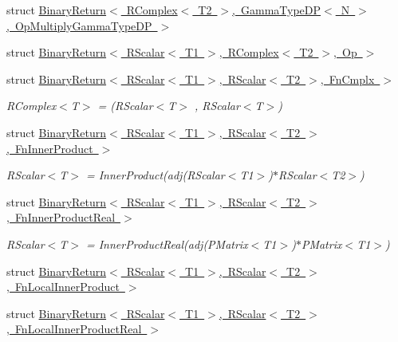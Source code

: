 \begin{DoxyCompactItemize}
\item 
struct \mbox{\hyperlink{structENSEM_1_1BinaryReturn_3_01RComplex_3_01T2_01_4_00_01GammaTypeDP_3_01N_01_4_00_01OpMultiplyGammaTypeDP_01_4}{Binary\+Return$<$ R\+Complex$<$ T2 $>$, Gamma\+Type\+D\+P$<$ N $>$, Op\+Multiply\+Gamma\+Type\+D\+P $>$}}
\item 
struct \mbox{\hyperlink{structENSEM_1_1BinaryReturn_3_01RScalar_3_01T1_01_4_00_01RComplex_3_01T2_01_4_00_01Op_01_4}{Binary\+Return$<$ R\+Scalar$<$ T1 $>$, R\+Complex$<$ T2 $>$, Op $>$}}
\item 
struct \mbox{\hyperlink{structENSEM_1_1BinaryReturn_3_01RScalar_3_01T1_01_4_00_01RScalar_3_01T2_01_4_00_01FnCmplx_01_4}{Binary\+Return$<$ R\+Scalar$<$ T1 $>$, R\+Scalar$<$ T2 $>$, Fn\+Cmplx $>$}}
\begin{DoxyCompactList}\small\item\em R\+Complex$<$\+T$>$ = (R\+Scalar$<$\+T$>$ , R\+Scalar$<$\+T$>$) \end{DoxyCompactList}\item 
struct \mbox{\hyperlink{structENSEM_1_1BinaryReturn_3_01RScalar_3_01T1_01_4_00_01RScalar_3_01T2_01_4_00_01FnInnerProduct_01_4}{Binary\+Return$<$ R\+Scalar$<$ T1 $>$, R\+Scalar$<$ T2 $>$, Fn\+Inner\+Product $>$}}
\begin{DoxyCompactList}\small\item\em R\+Scalar$<$\+T$>$ = Inner\+Product(adj(\+R\+Scalar$<$\+T1$>$)$\ast$\+R\+Scalar$<$\+T2$>$) \end{DoxyCompactList}\item 
struct \mbox{\hyperlink{structENSEM_1_1BinaryReturn_3_01RScalar_3_01T1_01_4_00_01RScalar_3_01T2_01_4_00_01FnInnerProductReal_01_4}{Binary\+Return$<$ R\+Scalar$<$ T1 $>$, R\+Scalar$<$ T2 $>$, Fn\+Inner\+Product\+Real $>$}}
\begin{DoxyCompactList}\small\item\em R\+Scalar$<$\+T$>$ = Inner\+Product\+Real(adj(\+P\+Matrix$<$\+T1$>$)$\ast$\+P\+Matrix$<$\+T1$>$) \end{DoxyCompactList}\item 
struct \mbox{\hyperlink{structENSEM_1_1BinaryReturn_3_01RScalar_3_01T1_01_4_00_01RScalar_3_01T2_01_4_00_01FnLocalInnerProduct_01_4}{Binary\+Return$<$ R\+Scalar$<$ T1 $>$, R\+Scalar$<$ T2 $>$, Fn\+Local\+Inner\+Product $>$}}
\item 
struct \mbox{\hyperlink{structENSEM_1_1BinaryReturn_3_01RScalar_3_01T1_01_4_00_01RScalar_3_01T2_01_4_00_01FnLocalInnerProductReal_01_4}{Binary\+Return$<$ R\+Scalar$<$ T1 $>$, R\+Scalar$<$ T2 $>$, Fn\+Local\+Inner\+Product\+Real $>$}}

\end{DoxyCompactItemize}
